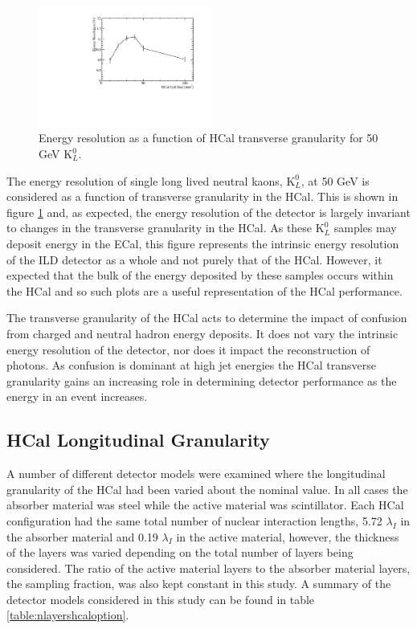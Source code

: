 \begin{figure}
\centering
\includegraphics[width=0.5\textwidth]{OptimisationStudies/Plots/EnergyResolution/ER_vs_HCalCellSize_50GeVKaon0L.pdf}
\caption[Energy resolution as a function of HCal transverse granularity for 50 GeV $\text{K}^{0}_{L}$.]{Energy resolution as a function of HCal transverse granularity for 50 GeV $\text{K}^{0}_{L}$.}
\label{fig:hcalcellskaon}
\end{figure}

The energy resolution of single long lived neutral kaons, $\text{K}^{0}_{L}$, at 50 GeV is considered as a function of transverse granularity in the HCal.  This is shown in figure \ref{fig:hcalcellskaon} and, as expected, the energy resolution of the detector is largely invariant to changes in the transverse granularity in the HCal.  As these $\text{K}^{0}_{L}$ samples may deposit energy in the ECal, this figure represents the intrinsic energy resolution of the ILD detector as a whole and not purely that of the HCal.  However, it expected that the bulk of the energy deposited by these samples occurs within the HCal and so such plots are a useful representation of the HCal performance.  

The transverse granularity of the HCal acts to determine the impact of confusion from charged and neutral hadron energy deposits.  It does not vary the intrinsic energy resolution of the detector, nor does it impact the reconstruction of photons.  As confusion is dominant at high jet energies the HCal transverse granularity gains an increasing role in determining detector performance as the energy in an event increases. 

\subsection{HCal Longitudinal Granularity}
\label{sec:hcalnlayers}
A number of different detector models were examined where the longitudinal granularity of the HCal had been varied about the nominal value.  In all cases the absorber material was steel while the active material was scintillator.  Each HCal configuration had the same total number of nuclear interaction lengths, 5.72 $\lambda_{I}$ in the absorber material and 0.19 $\lambda_{I}$ in the active material, however, the thickness of the layers was varied depending on the total number of layers being considered.  The ratio of the active material layers to the absorber material layers, the sampling fraction, was also kept constant in this study.  A summary of the detector models considered in this study can be found in table \ref{table:nlayershcaloption}.  

